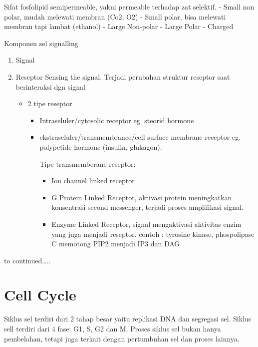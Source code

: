 \documentclass[
  letterpaper,
  DIV=11,
  numbers=noendperiod]{scrreprt}
\providecommand{\tightlist}{%
  \setlength{\itemsep}{0pt}\setlength{\parskip}{0pt}}\usepackage{longtable,booktabs,array}
\begin{document}
Sifat fosfolipid semipermeable, yakni permeable terhadap zat selektif. -
Small non polar, mudah melewati membran (Co2, O2) - Small polar, bisa
melewati membran tapi lambat (ethanol) - Large Non-polar - Large Polar -
Charged

Komponen sel signalling

\begin{enumerate}
\def\labelenumi{\arabic{enumi}.}
\item
  Signal
\item
  Reseptor Sensing the signal. Terjadi perubahan struktur reseptor saat
  berinteraksi dgn signal

  \begin{itemize}
  \tightlist
  \item
    2 tipe reseptor

    \begin{itemize}
    \item
      Intraseluler/cytosolic receptor eg. steorid hormone
    \item
      ekstraseluler/transmembrance/cell surface membrane receptor eg.
      polypetide hormone (insulin, glukagon).

      Tipe transmemberane reseptor:

      \begin{itemize}
      \tightlist
      \item
        Ion channel linked receptor
      \item
        G Protein Linked Receptor, aktivasi protein meningkatkan
        konsentrasi second messenger, terjadi proses amplifikasi signal.
      \item
        Enzyme Linked Receptor, signal mengaktivasi aktivitas enzim yang
        juga menjadi reseptor. contoh : tyrosine kinase, phospolipase C
        memotong PIP2 menjadi IP3 dan DAG
      \end{itemize}
    \end{itemize}
  \end{itemize}
\end{enumerate}

to continued\ldots..

\section{Cell Cycle}\label{cell-cycle}

Siklus sel terdiri dari 2 tahap besar yaitu replikasi DNA dan segregasi
sel. Siklus sell terdiri dari 4 fase: G1, S, G2 dan M. Proses siklus sel
bukan hanya pembelahan, tetapi juga terkait dengan pertumbuhan sel dan
proses lainnya.
\end{document}
